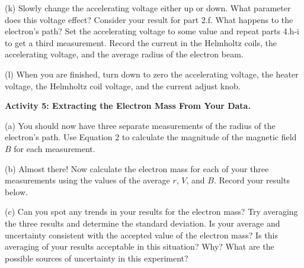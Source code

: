 (k) Slowly change the accelerating voltage either up or down.
What parameter does this voltage effect? Consider your result for part 2.f.
What happens to the electron's path?
Set the accelerating voltage 
to some value and
repeat parts 4.h-i to get a third measurement. Record the current in the
Helmholtz coils, the accelerating voltage, and the average radius of the electron beam.
\vspace{30mm}

(l) When you are finished, turn down to zero the accelerating voltage, the heater voltage, the Helmholtz coil voltage, and the current adjust knob.
\vspace{10mm}

\newpage

\textbf{Activity 5: Extracting the Electron Mass From Your Data.}

(a) You should now have three separate measurements of the radius of the electron's path.
Use Equation 2 to calculate the magnitude of the magnetic field $B$
for each measurement.
\vspace{30mm}

(b) Almost there! Now calculate the electron mass for each of your three measurements using
the values of the average $r$, $V$, and $B$. 
Record your results below.
\vspace{50mm}

(c) Can you spot any trends in your results for the electron mass?
Try averaging the three results and determine the standard deviation.
Is your average and uncertainty consistent with the accepted value of the electron mass?
Is this averaging of your results acceptable in this situation?
Why?
What are the possible sources of uncertainty in this experiment?



